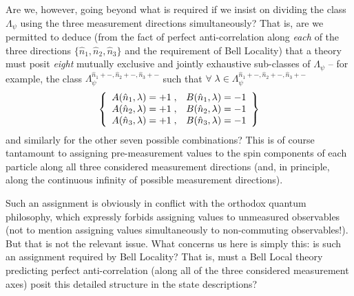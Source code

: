 \documentclass[aps,prc,onecolumn,12pt]{revtex4-2}
\begin{document}
Are we, however, going beyond what is required if we insist on
dividing the class $\Lambda_\psi $ using the three measurement
directions simultaneously?  That is, are we permitted to deduce (from
the fact of perfect anti-correlation along \emph{each} of the three
directions $\{ \hat{n}_1, \hat{n}_2, \hat{n}_3 \}$ and the requirement
of Bell Locality) that a theory must posit \emph{eight} mutually
exclusive and jointly exhaustive sub-classes
of $ \Lambda_\psi $ -- for example, the class
$ \Lambda^{ \hat{n}_1 +-, \hat{n}_2 +-, \hat{n}_3+-}_\psi  $
such that $\forall \; \lambda \in \Lambda^{ \hat{n}_1 +-, \hat{n}_2+-,
  \hat{n}_3+-}_\psi $
\begin{equation}
\left\{
\begin{array}{r@{\; , \quad}l}
A(\hat{n}_1,\lambda) = +1 & B(\hat{n}_1,\lambda)= -1 \\
A(\hat{n}_2,\lambda) = +1 & B(\hat{n}_2,\lambda) = -1 \\
A(\hat{n}_3,\lambda) = +1 & B(\hat{n}_3,\lambda) = -1
\end{array}
\right\}
\label{oneofeight}
\end{equation}
and similarly for the other seven possible combinations?  This is of
course tantamount to assigning pre-measurement values to the spin
components of each particle along all three considered measurement
directions (and, in principle, along the continuous infinity of
possible measurement directions).

Such an assignment is obviously in conflict
with the orthodox quantum philosophy, which expressly
forbids assigning values to unmeasured observables (not to mention
assigning values simultaneously to non-commuting observables!).
But that is not the relevant issue.  What concerns us here is simply
this:  is such an assignment required by Bell Locality?  That is, must
a Bell Local theory predicting perfect anti-correlation (along
all of the three considered measurement axes) posit this
detailed structure in the state descriptions?
\end{document}

